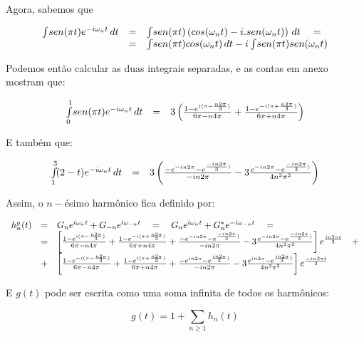 Agora, sabemos que

\[\displaystyle
\begin{array}{l c l}
  \int \! sen(\pi t) e^{-i \omega_n t}\, dt & = & \int \! sen(\pi t) \left( cos(\omega_n t) -i.sen(\omega_n t) \right) \, dt \quad = \\
    & = &  \int \! sen(\pi t)cos(\omega_n t) \, dt -i\int \! sen(\pi t)sen(\omega_n t)
\end{array}
\]

Podemos então calcular as duas integrais separadas, e as contas em anexo mostram que:

\[\displaystyle
\begin{array}{l c l}
  \int\limits_0^1 \! sen(\pi t) e^{-i \omega_n t}\, dt & = & 3 \left( \frac{1-e^{i(\pi-\frac{n2\pi}{3})}}{6\pi - n4\pi} + \frac{1-e^{-i(\pi+\frac{n2\pi}{3})}}{6\pi + n4\pi} \right)
\end{array}
\]

E também que:

\[\displaystyle
\begin{array}{l c l}
  \int\limits_1^3 \! (2-t) e^{-i \omega_n t}\, dt & = & 3 \left( \frac{-e^{-in2\pi}-e^{\frac{-in2\pi}{3})}}{-in2\pi} - 3 \frac{e^{-in2\pi}-e^{\frac{-in2\pi}{3})}}{4 n^2 \pi^2} \right)
\end{array}
\]

Assim, o $n-$ésimo harmônico fica definido por:

\[\displaystyle
\begin{array}{l c l}
  h_n^g(t) & = & G_n e^{i \omega_n t} + G_{-n} e^{i \omega_{-n} t} \quad = \quad G_n e^{i \omega_n t} + G_n^* e^{-i \omega_{-n} t} \quad = \\
         & = & \left[ \frac{1-e^{i(\pi-\frac{n2\pi}{3})}}{6\pi - n4\pi} + \frac{1-e^{-i(\pi+\frac{n2\pi}{3})}}{6\pi + n4\pi} + \frac{-e^{-in2\pi}-e^{\frac{-in2\pi}{3})}}{-in2\pi} - 3 \frac{e^{-in2\pi}-e^{\frac{-in2\pi}{3})}}{4 n^2 \pi^2} \right] e^{\frac{i n 2 \pi t}{3}} \quad + \\
         & + & \left[ \frac{1-e^{-i(\pi-\frac{n2\pi}{3})}}{6\pi - n4\pi} + \frac{1-e^{i(\pi+\frac{n2\pi}{3})}}{6\pi + n4\pi} + \frac{-e^{in2\pi}-e^{\frac{in2\pi}{3})}}{-in2\pi} - 3 \frac{e^{in2\pi}-e^{\frac{in2\pi}{3})}}{4 n^2 \pi^2} \right] e^{\frac{-i n 2 \pi t}{3}}
\end{array}
\]

E $g(t)$ pode ser escrita como uma soma infinita de todos os harmônicos:

\begin{equation}\displaystyle
  g(t) = 1+ \sum\limits_{n \ge 1} h_n(t)
  \label{eq:1b}
\end{equation}

